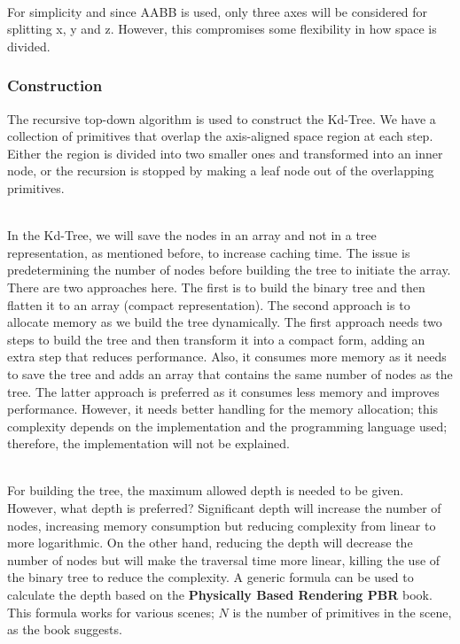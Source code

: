 \documentclass[11pt,a4paper]{article}
\begin{document}
\noindent
\\
For simplicity and since AABB is used, only three axes will be considered for splitting x, y and z. However, this compromises some flexibility in how space is divided.

\subsubsection{Construction}
The recursive top-down algorithm is used to construct the Kd-Tree. We have a collection of primitives that overlap the axis-aligned space region at each step. Either the region is divided into two smaller ones and transformed into an inner node, or the recursion is stopped by making a leaf node out of the overlapping primitives.

\noindent
\\
In the Kd-Tree, we will save the nodes in an array and not in a tree representation, as mentioned before, to increase caching time. The issue is predetermining the number of nodes before building the tree to initiate the array. There are two approaches here. The first is to build the binary tree and then flatten it to an array (compact representation). The second approach is to allocate memory as we build the tree dynamically. The first approach needs two steps to build the tree and then transform it into a compact form, adding an extra step that reduces performance. Also, it consumes more memory as it needs to save the tree and adds an array that contains the same number of nodes as the tree. The latter approach is preferred as it consumes less memory and improves performance. However, it needs better handling for the memory allocation; this complexity depends on the implementation and the programming language used; therefore, the implementation will not be explained. 

\noindent
\\
For building the tree, the maximum allowed depth is needed to be given. However, what depth is preferred? Significant depth will increase the number of nodes, increasing memory consumption but reducing complexity from linear to more logarithmic. On the other hand, reducing the depth will decrease the number of nodes but will make the traversal time more linear, killing the use of the binary tree to reduce the complexity. A generic formula can be used to calculate the depth based on the \textbf{Physically Based Rendering PBR} \protect\cite{Pharr2016} book. This formula works for various scenes; $ N$ is the number of primitives in the scene, as the book suggests.
\end{document}
